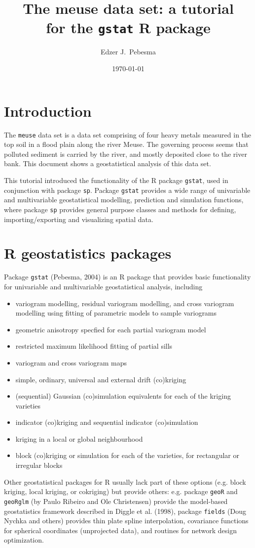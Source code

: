 \documentclass[a4paper]{article}
\title{The meuse data set: a tutorial\\
for the {\tt gstat} R package }
\author{Edzer J.\ Pebesma}
\date{\today}
\newcommand{\code}[1]{{\tt #1}}
\begin{document}
\maketitle

\section{Introduction}
The \code{meuse} data set is a data set comprising of four heavy metals
measured in the top soil in a flood plain along the river Meuse. The
governing process seems that polluted sediment is carried by the river,
and mostly deposited close to the river bank. This document shows a
geostatistical analysis of this data set.

This tutorial introduced the functionality of the R package \code{gstat},
used in conjunction with package \code{sp}. Package \code{gstat} provides
a wide range of univariable and multivariable geostatistical modelling,
prediction and simulation functions, where package \code{sp} provides
general purpose classes and methods for defining, importing/exporting
and visualizing spatial data.

\section{R geostatistics packages}
Package \code{gstat} (Pebesma, 2004) is an R package that provides basic
functionality for univariable and multivariable geostatistical analysis,
including 
\begin{itemize}
\item variogram modelling, residual variogram modelling, and cross variogram
modelling using fitting of parametric models to sample variograms
\item geometric anisotropy specfied for each partial variogram model
\item restricted maximum likelihood fitting of partial sills 
\item variogram and cross variogram maps
\item simple, ordinary, universal and external drift (co)kriging
\item (sequential) Gaussian (co)simulation equivalents for each of
the kriging varieties
\item indicator (co)kriging and sequential indicator (co)simulation
\item kriging in a local or global neighbourhood 
\item block (co)kriging or simulation for each of the varieties, for
rectangular or irregular blocks
\end{itemize}
Other geostatistical packages for R usually lack part of these options
(e.g. block kriging, local kriging, or cokriging) but provide others:
e.g. package \code{geoR} and \code{geoRglm} (by Paulo Ribeiro and Ole
Christensen) provide the model-based geostatistics framework described
in Diggle et al. (1998), package \code{fields} (Doug Nychka and others)
provides thin plate spline interpolation, covariance functions for
spherical coordinates (unprojected data), and routines for network
design optimization.
\end{document}
